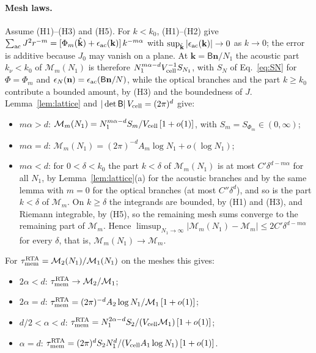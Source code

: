\documentclass[aps,prb,10pt,onecolumn,amsmath,amssymb,superscriptaddress,nofootinbib]{revtex4-2}
\theoremstyle{plain}
\newcommand{\tmem}{\tau_{\rm mem}}
\begin{document}
\paragraph*{Mesh laws.}
Assume (H1)--(H3) and (H5). For $k<k_0$, (H1)--(H2) give
$\sum_{\rm ac}J^2r^{-m}=[\Phi_m(\hat{\mathbf k})+\epsilon_{\rm ac}(\mathbf k)]\,k^{-m\alpha}$ with
$\sup_{\hat{\mathbf k}}|\epsilon_{\rm ac}(\mathbf k)|\to0$ as $k\to0$; the error is additive because $J_0$
may vanish on a plane. At $\mathbf k=\mathsf B\mathbf n/N_1$ the acoustic part $k_\nu<k_0$ of
$\mathcal M_m(N_1)$ is therefore $N_1^{m\alpha-d}V_{\rm cell}^{-1}S_{N_1}$, with $S_N$ of Eq.~\eqref{eq:SN}
for $\Phi=\Phi_m$ and $\epsilon_N(\mathbf n)=\epsilon_{\rm ac}(\mathsf B\mathbf n/N)$, while the optical branches
and the part $k\ge k_0$ contribute a bounded amount, by (H3) and the boundedness of $J$.
Lemma~\ref{lem:lattice} and $|\det\mathsf B|\,V_{\rm cell}=(2\pi)^d$ give:
\begin{itemize}
\item $m\alpha>d$: $\mathcal M_m(N_1)=N_1^{m\alpha-d}S_m/V_{\rm cell}\,[1+o(1)]$, with $S_m=S_{\Phi_m}\in(0,\infty)$;
\item $m\alpha=d$: $\mathcal M_m(N_1)=(2\pi)^{-d}A_m\log N_1+o(\log N_1)$;
\item $m\alpha<d$: for $0<\delta<k_0$ the part $k<\delta$ of $\mathcal M_m(N_1)$ is at most
$C'\delta^{d-m\alpha}$ for all $N_1$, by Lemma~\ref{lem:lattice}(a) for the acoustic branches and by the same lemma with $m=0$ for the optical branches (at most $C''\delta^d$), and so is the part $k<\delta$ of
$\mathcal M_m$. On $k\ge\delta$ the integrands are bounded, by (H1) and (H3), and Riemann integrable, by
(H5), so the remaining mesh sums converge to the remaining part of $\mathcal M_m$. Hence
$\limsup_{N_1\to\infty}|\mathcal M_m(N_1)-\mathcal M_m|\le2C'\delta^{d-m\alpha}$ for every $\delta$, that is,
$\mathcal M_m(N_1)\to\mathcal M_m$.
\end{itemize}
For $\tmem^{\rm RTA}=\mathcal M_2(N_1)/\mathcal M_1(N_1)$ on the meshes this gives:
\begin{itemize}
\item $2\alpha<d$: $\tmem^{\rm RTA}\to\mathcal M_2/\mathcal M_1$;
\item $2\alpha=d$: $\tmem^{\rm RTA}=(2\pi)^{-d}A_2\log N_1/\mathcal M_1\,[1+o(1)]$;
\item $d/2<\alpha<d$: $\tmem^{\rm RTA}=N_1^{2\alpha-d}S_2/(V_{\rm cell}\mathcal M_1)\,[1+o(1)]$;
\item $\alpha=d$: $\tmem^{\rm RTA}=(2\pi)^dS_2N_1^d/(V_{\rm cell}A_1\log N_1)\,[1+o(1)]$.
\end{itemize}
\end{document}

